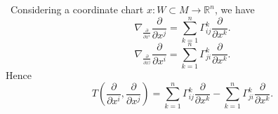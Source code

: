 \documentclass[12pt,a4paper]{book}
\newenvironment{prooff}{{\noindent\it\textcolor{cyan!40!black}{Proof}:}\,}{\par}
\theoremstyle{definition}
\begin{document}
\begin{prooff}
    Considering a coordinate chart $x: W \subset M \rightarrow \mathbb{R}^n$, we have
    $$
        \nabla_{\frac{\partial}{\partial x^i}} \frac{\partial}{\partial x^j}=\sum_{k=1}^n \Gamma_{i j}^k \frac{\partial}{\partial x^k} .
    $$
    $$
        \nabla_{\frac{\partial}{\partial x^j}} \frac{\partial}{\partial x^i}=\sum_{k=1}^n \Gamma_{j i}^k \frac{\partial}{\partial x^k} .
    $$
    Hence
    \begin{equation*}
        T(\frac{\partial}{\partial x^i},\frac{\partial}{\partial x^j})=\sum_{k=1}^n \Gamma_{i j}^k \frac{\partial}{\partial x^k}-\sum_{k=1}^n \Gamma_{j i}^k \frac{\partial}{\partial x^k} .
    \end{equation*}



\end{prooff}
\end{document}
